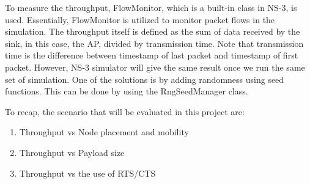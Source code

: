To measure the throughput, FlowMonitor, which is a built-in class in NS-3, is used. Essentially, FlowMonitor is utilized to monitor packet flows in the simulation. The throughput itself is defined as the sum of data received by the sink, in this case, the AP, divided by transmission time. Note that transmission time is the difference between timestamp of last packet and timestamp of first packet. However, NS-3 simulator will give the same result once we run the same set of simulation. One of the solutions is by adding randomness using seed functions. This can be done by using the RngSeedManager class. 

To recap, the scenario that will be evaluated in this project are:
\begin{enumerate}
\item Throughput vs Node placement and mobility
\item Throughput vs Payload size
\item Throughput vs the use of RTS/CTS
\end{enumerate}